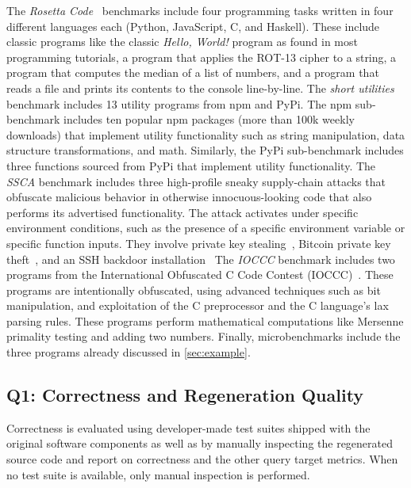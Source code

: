 \documentclass[nonacm,sigplan,review]{acmart}
\begin{document}
The \textit{Rosetta Code}~\cite{rosettacode} benchmarks include four programming tasks written in four different
languages each (Python, JavaScript, C, and Haskell). 
These include classic programs like
the classic \emph{Hello, World!} program as found in most programming tutorials,
a program that applies the ROT-13 cipher to a string,
a program that computes the median of a list of numbers,
and a program that reads a file and prints its contents to the console line-by-line.
The \textit{short utilities} benchmark includes 13 utility programs from npm and PyPi.
The npm sub-benchmark includes ten popular npm packages (more than 100k weekly downloads) that implement utility
functionality such as string manipulation, data structure transformations, and math.
Similarly, the PyPi sub-benchmark includes three functions sourced from PyPi that implement utility functionality.
The \textit{SSCA} benchmark includes three high-profile sneaky supply-chain attacks that obfuscate malicious behavior in otherwise innocuous-looking code that also performs its advertised functionality.
The attack activates under specific environment conditions, such as the presence of a specific environment variable or specific function inputs.
They involve private key stealing~\cite{ohm2020backstabber}, Bitcoin private key theft~\cite{ev:eurosec:2022}, and an SSH backdoor installation~\cite{copeland2019frightening}
The \textit{IOCCC} benchmark includes two programs from the International Obfuscated C Code Contest (IOCCC)~\cite{ioccc}.
These programs are intentionally obfuscated, using advanced techniques such as bit manipulation,
and exploitation of the C preprocessor and the C language's lax parsing rules.
These programs perform mathematical computations like Mersenne primality testing and adding two numbers.
Finally, microbenchmarks include the three programs already discussed in \cref{sec:example}.

\subsection{Q1: Correctness and Regeneration Quality}

Correctness is evaluated using developer-made test suites 
shipped with the original software components as well as by manually inspecting
the regenerated source code and report on correctness and the other query target metrics.
When no test suite is available, only manual inspection is performed.
\end{document}
